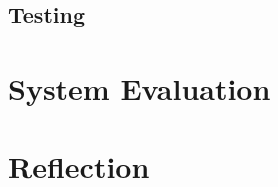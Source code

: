 \documentclass[11pt]{article}
\begin{document}
\subsection*{Testing}


\section{System Evaluation}

\section{Reflection}
\end{document}

